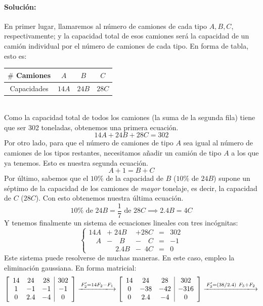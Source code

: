 \paragraph{Solución:} 
En primer lugar, llamaremos al número de camiones de cada tipo $A,B,C$, respectivamente; y la capacidad total de esos camiones será la capacidad de un camión individual por el número de camiones de cada tipo. En forma de tabla, esto es:
\begin{table}[!h]
    \centering
    \begin{tabular}{c|c|c|c}
         $\#$ Camiones& $A$&$B$&$C$  \\ \hline
         Capacidades& $14A$&$24B$&$28C$ 
    \end{tabular}
    \label{tab:my_label}
\end{table}\\
Como la capacidad total de todos los camiones (la suma de la segunda fila) tiene que ser 302 toneladas, obtenemos una primera ecuación.
\begin{equation}
    \boxed{14A+24B+28C=302}
\end{equation}
Por otro lado, para que el número de camiones de tipo $A$ sea igual al número de camiones de los tipos restantes, necesitamos añadir un camión de tipo $A$ a los que ya tenemos. Esto es nuestra segunda ecuación.
\begin{equation}
    \boxed{A+1=B+C}
\end{equation}
Por último, sabemos que el $10\%$ de la capacidad de $B$ ($10\%$ de $24B$) supone un séptimo de la capacidad de los camiones de \emph{mayor} tonelaje, es decir, la capacidad de $C$ ($28C$). Con esto obtenemos nuestra última ecuación.
\begin{equation}
    10\% \text{ de } 24B=\frac{1}{7} \text{ de } 28C\implies \boxed{2.4B=4C}
\end{equation}
Y tenemos finalmente un sistema de ecuaciones lineales con tres incógnitas:
$$
\left \{ \begin{array}{ccccc}
     14A&+\phantom{.}24B  &+28C&=&302  \\
     \phantom{14}A  &-\phantom{24}B    &-\phantom{28}C  &=&-1\\
        & \phantom{-}2.4B &-\phantom{8}4C &=&0
\end{array} \right .
$$
Este sistema puede resolverse de muchas maneras. En este caso, empleo la eliminación gaussiana. En forma matricial:
$$
\left [ \begin{array}{ccc|c}
    14 &24&28&302  \\
    1 & -1&-1&-1   \\
    0& 2.4& -4 &0
\end{array} \right ] \xlongrightarrow{F_2'=14 F_2 -F_1} \left [ \begin{array}{ccc|c}
    14 &24&28&302  \\
    0 & -38&-42&-316   \\
    0& 2.4& -4 &0
\end{array} \right ]\xlongrightarrow{F_3'=(38/2.4) \ F_3 +F_2}
$$
